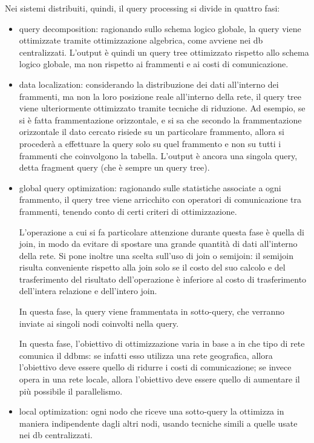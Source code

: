 Nei sistemi distribuiti, quindi, il query processing si divide in quattro fasi:
\begin{itemize}
    \item query decomposition: ragionando sullo schema logico globale,
    la query viene ottimizzate tramite ottimizzazione algebrica, come
    avviene nei db centralizzati. L'output è quindi un query tree ottimizzato
    rispetto allo schema logico globale, ma non rispetto ai frammenti e ai
    costi di comunicazione.
    \item data localization: considerando la distribuzione dei dati all'interno
    dei frammenti, ma non la loro posizione reale all'interno della rete, il query tree viene ulteriormente
    ottimizzato tramite tecniche di riduzione. Ad esempio, se si è fatta frammentazione
    orizzontale, e si sa che secondo la frammentazione orizzontale il dato cercato
    risiede su un particolare frammento, allora si procederà a effettuare
    la query solo su quel frammento e non su tutti i frammenti che coinvolgono la
    tabella. L'output è ancora una singola query, detta fragment query (che è
    sempre un query tree).
    \item global query optimization: ragionando sulle statistiche associate a
    ogni frammento, il query tree viene arricchito con operatori di comunicazione
    tra frammenti, tenendo conto di certi criteri di ottimizzazione.

    L'operazione a cui si fa particolare attenzione durante questa fase è
    quella di join, in modo da evitare di spostare una grande quantità di dati
    all'interno della rete. Si pone inoltre una scelta sull'uso di join
    o semijoin: il semijoin risulta conveniente rispetto alla join solo se
    il costo del suo calcolo e del trasferimento del risultato dell'operazione
    è inferiore al costo di trasferimento dell'intera relazione e dell'intero join.

    In questa fase, la query viene frammentata
    in sotto-query, che verranno inviate ai singoli nodi coinvolti nella
    query.

    In questa fase, l'obiettivo di ottimizzazione varia in base a in che
    tipo di rete comunica il ddbms: se infatti esso utilizza una rete geografica,
    allora l'obiettivo deve essere quello di ridurre i costi di comunicazione;
    se invece opera in una rete locale, allora l'obiettivo deve essere quello
    di aumentare il più possibile il parallelismo.
    \item local optimization: ogni nodo che riceve una sotto-query la ottimizza
    in maniera indipendente dagli altri nodi, usando tecniche simili a quelle
    usate nei db centralizzati.
\end{itemize}

